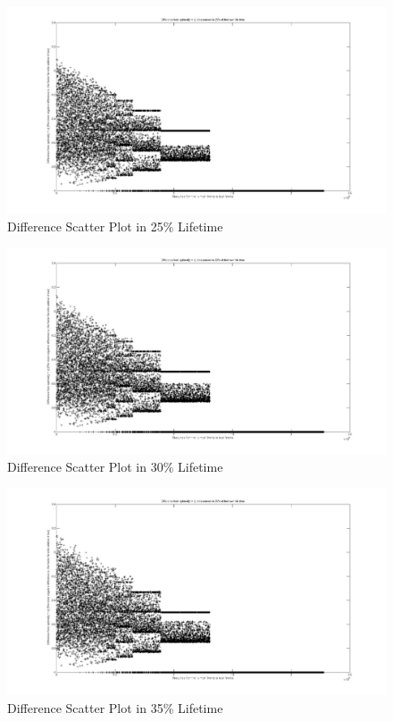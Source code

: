 \documentclass[12pt,a4paper]{report}
\begin{document}
	\vspace{-5cm}
	\begin{figure}
	\hspace{-3.7cm}\includegraphics[width=200mm]{fifth.jpg}
	\caption{Difference Scatter Plot in 25\% Lifetime}
	\end{figure}

	\vspace{-5cm}
	\begin{figure}
	\hspace{-3.7cm}\includegraphics[width=200mm]{sixth.jpg}
	\caption{Difference Scatter Plot in 30\% Lifetime}
	\end{figure}

	\vspace{-5cm}
	\begin{figure}
	\hspace{-3.7cm}\includegraphics[width=200mm]{seventh.jpg}
	\caption{Difference Scatter Plot in 35\% Lifetime}
	\end{figure}
\end{document}
